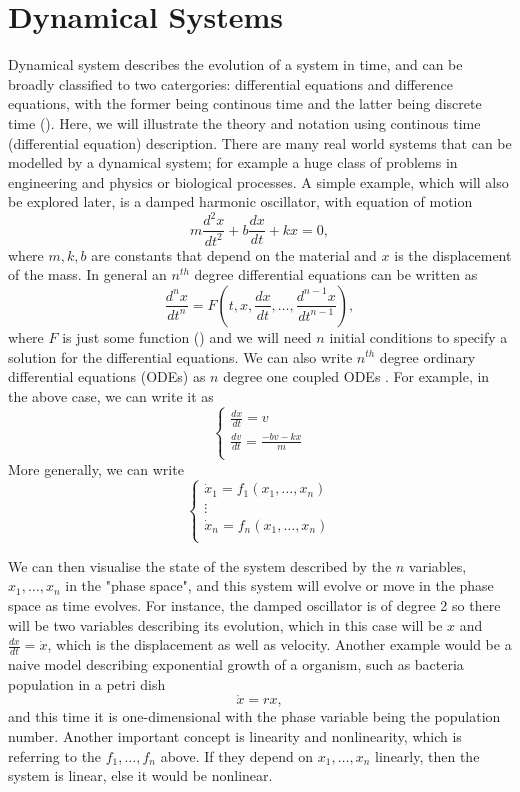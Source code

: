 \documentclass{statsmsc}
\begin{document}
\section{Dynamical Systems}
Dynamical system describes the evolution of a system in time, and can be broadly classified to two catergories: differential equations and difference equations, with the former being continous time and the latter being discrete time (\cite{strogatz_2019}). 
Here, we will illustrate the theory and notation using continous time (differential equation) description.
There are many real world systems that can be modelled by a dynamical system; for example a huge class of problems in engineering and physics or biological processes. 
A simple example, which will also be explored later, is a damped harmonic oscillator, with equation of motion
\begin{equation}
m\frac{d^2x}{dt^2}+b\frac{dx}{dt}+kx=0,
\label{equ:damped}
\end{equation}
where $m, k, b$ are constants that depend on the material and $x$ is the displacement of the mass.
In general an $n^{th}$ degree differential equations can be written as 
$$
\frac{d^{n} x}{d t^{n}}=F\left(t, x, \frac{d x}{d t}, \ldots, \frac{d^{n-1} x}{d t^{n-1}}\right),
$$
where $F$ is just some function (\cite{glendinning_1994}) and we will need $n$ initial conditions to specify a solution for the differential equations.
We can also write $n^{th}$ degree ordinary differential equations (ODEs) as $n$ degree one coupled ODEs \cite{strogatz_2019}. 
For example, in the above case, we can write it as 
$$
\begin{cases}
  \frac{dx}{dt} = v\\
  \frac{dv}{dt} = \frac{-bv-kx}{m}\\
\end{cases}
$$
More generally, we can write 
$$
\begin{cases}
  \dot{x}_1=f_1(x_1, \dots, x_n)\\ 
  \vdots\\
  \dot{x}_n=f_n(x_1, \dots, x_n)\\ 
\end{cases}
$$

We can then visualise the state of the system described by the $n$ variables,$x_1, \dots, x_n$ in the "phase space", and this system will evolve or move in the phase space as time evolves. 
For instance, the damped oscillator is of degree 2 so there will be two variables describing its evolution, which in this case will be $x$ and $\frac{dx}{dt}=\dot{x}$, which is the displacement as well as velocity.
Another example would be a naive model describing exponential growth of a organism, such as bacteria population in a petri dish
$$
\dot{x}=rx,
$$
and this time it is one-dimensional with the phase variable being the population number.
Another important concept is linearity and nonlinearity, which is referring to the $f_1, \dots ,f_n$ above.
If they depend on $x_1, \dots, x_n$ linearly, then the system is linear, else it would be nonlinear.
\end{document}
